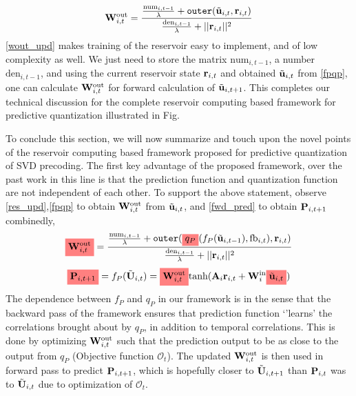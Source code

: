 \documentclass[conference]{IEEEtran}
\newcommand{\highlight}[1]{%
  \colorbox{red!50}{$\displaystyle#1$}}
\begin{document}
\begin{equation}
\bW_{i,t}^{\text{out}}=\frac{\frac{\text{num}_{i,t-1}}{\lambda}+\texttt{outer}(\tilde{\bu}_{i,t},\br_{i,t})}{\frac{\text{den}_{i,t-1}}{\lambda}+||\br_{i,t}||^2}
\label{wout_upd}
\end{equation}
\eqref{wout_upd} makes training of the reservoir easy to implement, and of low complexity as well.
We just need to store the matrix $\text{num}_{i,t-1}$, a number $\text{den}_{i,t-1}$, and using the current reservoir state ${\bf r}_{i,t}$ and obtained $\tilde{{\bf u}}_{i,t}$ from \eqref{fpqp}, one can calculate ${\bf W}_{i,t}^{\text{out}}$ for forward calculation of $\tilde{{\bf u}}_{i,t+1}$.
This completes our technical discussion for the complete reservoir computing based framework for predictive quantization illustrated in Fig. %

To conclude this section, we will now summarize and touch upon the novel points of the reservoir computing based framework proposed for predictive quantization of SVD precoding.
The first key advantage of the proposed framework, over the past work in this line \cite{Gupt1905:Predictive,6891198,6545375} is that the prediction function and quantization function are not independent of each other.
To support the above statement, observe \eqref{res_upd},\eqref{fpqp} to obtain ${\bf W}^{\text{out}}_{i,t}$ from $\tilde{{\bf u}}_{i,t}$, and \eqref{fwd_pred} to obtain ${\bf P}_{i,t+1}$ combinedly,
\begin{equation*}
\highlight{\bW_{i,t}^{\text{out}}}=\frac{\frac{\text{num}_{i,t-1}}{\lambda}+\texttt{outer}(\highlight{q_P}(f_P(\tilde{\bu}_{i,t-1}),\text{fb}_{i,t}),\br_{i,t})}{\frac{\text{den}_{i,t-1}}{\lambda}+||\br_{i,t}||^2}
\end{equation*}
\begin{equation*}
\highlight{\bP_{i,t+1}}=f_P(\tilde{\bU}_{i,t})=\highlight{\bW^{\text{out}}_{i,t}}\text{tanh}(\bA_i\br_{i,t}+\bW^{\text{in}}_i\highlight{\tilde{\bu}_{i,t}})
\end{equation*}
The dependence between $f_P$ and $q_P$ in our framework is in the sense that the backward pass of the framework ensures that prediction function `'learns' the correlations brought about by $q_P$, in addition to temporal correlations. %
This is done by optimizing ${\bf W}_{i,t}^{\text{out}}$ such that the prediction output to be as close to the output from $q_P$ (Objective function $\mathcal{O}_t$).
The updated ${\bf W}_{i,t}^{\text{out}}$ is then used in forward pass to predict ${\bf P}_{i,t+1}$, which is hopefully closer to $\tilde{{\bf U}}_{i,t+1}$ than ${\bf P}_{i,t}$ was to $\tilde{{\bf U}}_{i,t}$ due to optimization of $\mathcal{O}_t$.
\end{document}
